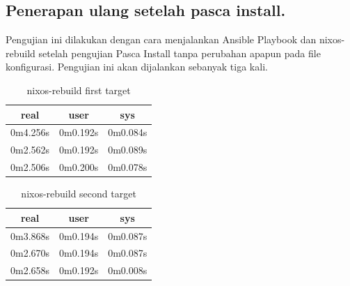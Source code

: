 \documentclass[10pt,]{report}
\begin{document}
\begin{adjustwidth}{20pt}{}
	\subsection{Penerapan ulang setelah pasca install.}
	\begin{adjustwidth}{20pt}{}
		Pengujian ini dilakukan dengan cara menjalankan Ansible Playbook dan nixos-rebuild
		setelah pengujian Pasca Install tanpa perubahan apapun pada file konfigurasi. Pengujian ini
		akan dijalankan sebanyak tiga kali.
	\end{adjustwidth}
	\vspace{-3mm}
	\begin{table}[H]
		\begin{center}
			\begin{tabular}[c]{|c|c|c|}
				\hline
				\multicolumn{1}{|c|}{\textbf{real}} &
				\multicolumn{1}{c|}{\textbf{user}}  &
				\multicolumn{1}{c|}{\textbf{sys}}                         \\
				\hline
				0m4.256s                            & 0m0.192s & 0m0.084s \\
				\hline
				0m2.562s                            & 0m0.192s & 0m0.089s \\
				\hline
				0m2.506s                            & 0m0.200s & 0m0.078s \\
				\hline
			\end{tabular}
		\end{center}
		\caption{nixos-rebuild first target}
	\end{table}
	\begin{table}[H]
		\begin{center}
			\begin{tabular}[c]{|c|c|c|}
				\hline
				\multicolumn{1}{|c|}{\textbf{real}} &
				\multicolumn{1}{c|}{\textbf{user}}  &
				\multicolumn{1}{c|}{\textbf{sys}}                         \\
				\hline
				0m3.868s                            & 0m0.194s & 0m0.087s \\
				\hline
				0m2.670s                            & 0m0.194s & 0m0.087s \\
				\hline
				0m2.658s                            & 0m0.192s & 0m0.008s \\
				\hline
			\end{tabular}
		\end{center}
		\caption{nixos-rebuild second target}
	\end{table}

\end{adjustwidth}
\end{document}
